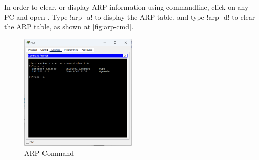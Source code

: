 In order to clear, or display ARP information using commandline, click on any
PC and open . Type \mono!arp -a! to display
the ARP table, and type \mono!arp -d! to clear the ARP table, as shown at \autoref{fig:arp-cmd}.

\begin{figure}
    \centering
    \includegraphics[width=0.5\textwidth]{images/arp-cmd.png}
    \caption{ARP Command}\label{fig:arp-cmd}
\end{figure}

